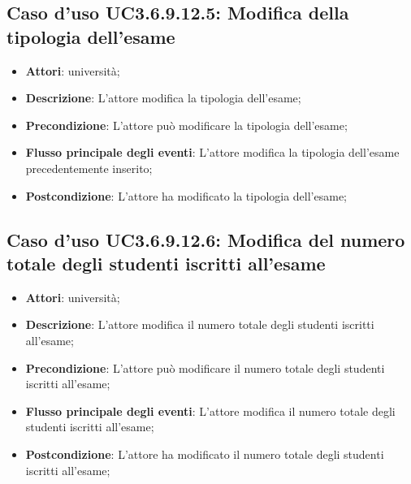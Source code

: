 \subsection{Caso d'uso \texorpdfstring{UC3.6.9.12.5}{UC3.6.9.12.5}: Modifica della tipologia dell’esame}
\begin{itemize}
\item \textbf{Attori}: università;
\item \textbf{Descrizione}: L'attore modifica la tipologia dell’esame;

\item \textbf{Precondizione}: L'attore può modificare la tipologia dell’esame;

\item \textbf{Flusso principale degli eventi}: L'attore modifica la tipologia dell’esame precedentemente inserito;

\item \textbf{Postcondizione}: L'attore ha modificato la tipologia dell’esame;

\end{itemize}
\subsection{Caso d'uso \texorpdfstring{UC3.6.9.12.6}{UC3.6.9.12.6}: Modifica del numero totale degli studenti iscritti all’esame}
\begin{itemize}
\item \textbf{Attori}: università;
\item \textbf{Descrizione}: L'attore modifica il numero totale degli studenti iscritti all’esame;

\item \textbf{Precondizione}: L'attore può modificare il numero totale degli studenti iscritti all’esame;

\item \textbf{Flusso principale degli eventi}: L'attore modifica il numero totale degli studenti iscritti all’esame;

\item \textbf{Postcondizione}: L'attore ha modificato il numero totale degli studenti iscritti all’esame;

\end{itemize}
